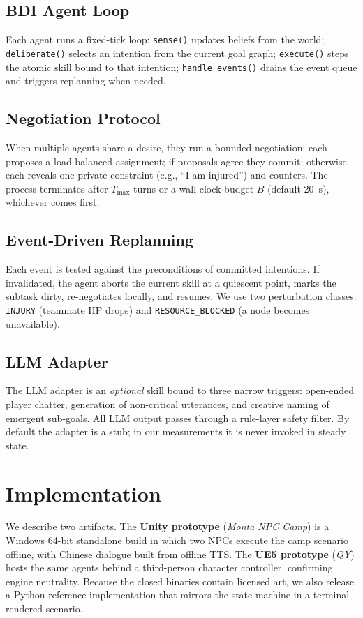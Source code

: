 \documentclass[sigconf, authorversion]{acmart}
\begin{document}
\subsection{BDI Agent Loop}
\label{sec:bdi}
Each agent runs a fixed-tick loop: \texttt{sense()} updates beliefs from
the world; \texttt{deliberate()} selects an intention from the current
goal graph; \texttt{execute()} steps the atomic skill bound to that
intention; \texttt{handle\_events()} drains the event queue and triggers
replanning when needed.

\subsection{Negotiation Protocol}
\label{sec:neg}
When multiple agents share a desire, they run a bounded negotiation: each
proposes a load-balanced assignment; if proposals agree they commit;
otherwise each reveals one private constraint (e.g., ``I am injured'')
and counters. The process terminates after $T_{\max}$ turns or a wall-clock
budget $B$ (default 20~s), whichever comes first.

\subsection{Event-Driven Replanning}
\label{sec:replan}
Each event is tested against the preconditions of committed intentions.
If invalidated, the agent aborts the current skill at a quiescent point,
marks the subtask dirty, re-negotiates locally, and resumes. We use two
perturbation classes: \texttt{INJURY} (teammate HP drops) and
\texttt{RESOURCE\_BLOCKED} (a node becomes unavailable).

\subsection{LLM Adapter}
The LLM adapter is an \emph{optional} skill bound to three narrow triggers:
open-ended player chatter, generation of non-critical utterances, and
creative naming of emergent sub-goals. All LLM output passes through a
rule-layer safety filter. By default the adapter is a stub; in our
measurements it is never invoked in steady state.

\section{Implementation}
\label{sec:impl}
We describe two artifacts. The \textbf{Unity prototype} (\emph{Monta NPC
Camp}) is a Windows 64-bit standalone build in which two NPCs execute the
camp scenario offline, with Chinese dialogue built from offline TTS. The
\textbf{UE5 prototype} (\emph{QY}) hosts the same agents behind a
third-person character controller, confirming engine neutrality. Because
the closed binaries contain licensed art, we also release a Python
reference implementation that mirrors the state machine in a
terminal-rendered scenario.
\end{document}
